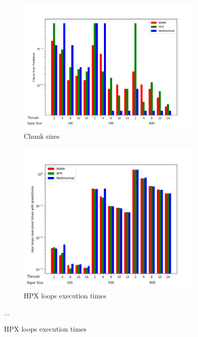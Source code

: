 \documentclass[12pt]{article}
\begin{document}
\begin{figure}[h]
	\centering
	\begin{subfigure}[b]{0.515\textwidth}
		\centering
		\includegraphics[width=\textwidth]{matrix_mult_prediction_bars.png}
		\caption[Network2]%
		{{Chunk sizes}}    
	\end{subfigure}
	\hfill
	\begin{subfigure}[b]{0.475\textwidth}  
		\centering 
		\includegraphics[width=\textwidth]{matrix_mult_times_bars.png}
		\caption[]%
		{{HPX loops execution times}}    
	\end{subfigure}
	{...} 
	
\end{figure}
\end{document}

